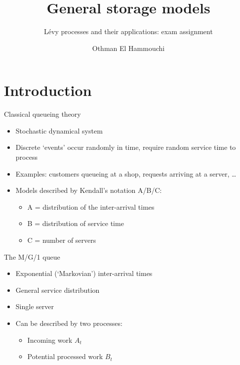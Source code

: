 \documentclass{beamer}
\title{General storage models}
\subtitle{L\'evy processes and their applications: exam assignment}
\author{Othman El Hammouchi}
\begin{document}
\frame{\maketitle}

\section{Introduction}

\begin{frame}{Classical queueing theory}
  \begin{itemize}
    \item Stochastic dynamical system
    \item Discrete `events' occur randomly in time, require random service time to process
    \item Examples: customers queueing at a shop, requests arriving at a server, \ldots
    \item Models described by Kendall's notation A/B/C:
          \begin{itemize}
            \item A = distribution of the inter-arrival times
            \item B = distribution of service time
            \item C = number of servers
          \end{itemize}
  \end{itemize}
\end{frame}

\begin{frame}{The M/G/1 queue}
  \begin{itemize}
    \item Exponential (`Markovian') inter-arrival times
    \item General service distribution
    \item Single server
    \item Can be described by two processes:
          \begin{itemize}
            \item Incoming work $A_t$
            \item Potential processed work $B_t$
          \end{itemize}
  \end{itemize}
\end{frame}
\end{document}
